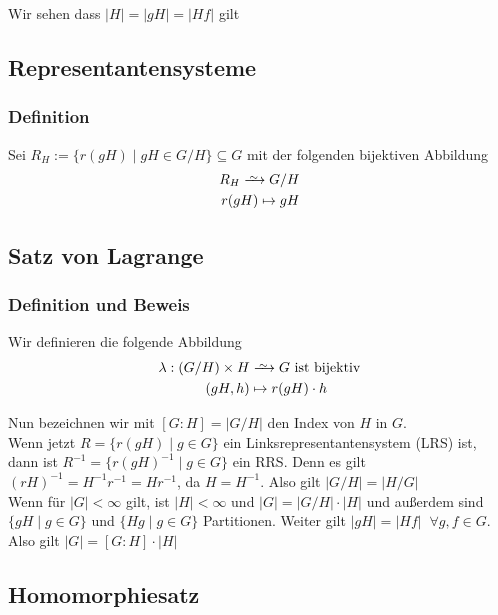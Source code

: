 \documentclass[12pt, german]{article}
\newcommand\iso{\xrightarrow{
		\,\smash{\raisebox{-0.65ex}{\ensuremath{\scriptstyle\sim}}}\,}}
\begin{document}
Wir sehen dass $|H|=|gH| = |Hf|$ gilt


\subsection{Representantensysteme}		
\subsubsection{Definition}
	Sei $R_H := \{r(gH) \mid gH \in G/H\} \subseteq G$ mit der folgenden bijektiven  Abbildung
	\begin{align*}
		R_H \iso G/H \\
		r(gH) \mapsto gH 
	\end{align*}
\subsection{Satz von Lagrange}		
\subsubsection{Definition und Beweis}
	Wir definieren die folgende Abbildung
	\begin{align*}
		\lambda: (G/H) \times H &\iso G \text{ ist bijektiv} \\
		(gH, h) &\mapsto r(gH) \cdot h
	\end{align*}
	 
	Nun bezeichnen wir mit $[G:H] = |G/H|$ den Index von $H$ in $G$. \\ 
	Wenn jetzt $R = \{r(gH) \mid g \in G \}$ ein Linksrepresentantensystem (LRS) ist, \\ 
	dann ist $R^{-1} = \{r(gH)^{-1} \mid g \in G \}$ ein RRS. 
	Denn es gilt $(rH)^{-1} = H^{-1}r^{-1} = Hr^{-1}$, da $H=H^{-1}$.
	Also gilt $|G/H| = |H/G|$ \\
	
	Wenn für $|G| < \infty $ gilt, ist $|H| < \infty $ und $|G| = |G/H| \cdot |H|$ und 
	außerdem sind $\{gH \mid g \in G \}$ und $\{Hg \mid g \in G \}$ Partitionen. Weiter gilt $|gH| = |Hf| \;\;\forall g,f \in G$. \\
	Also gilt $|G| = [G:H] \cdot |H|$ 


\subsection{Homomorphiesatz}		
\end{document}
